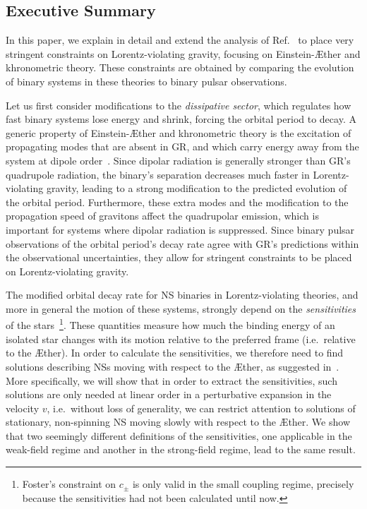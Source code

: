 \documentclass[prd,aps,twocolumn,nofootinbib,showpacs,superscriptaddress]{revtex4-1}
\begin{document}
\subsection{Executive Summary}

In this paper, we explain in detail and extend the analysis of Ref.~\cite{Yagi:2013qpa} to place very stringent constraints on Lorentz-violating gravity, 
focusing on Einstein-\AE ther and khronometric theory. These constraints are obtained by comparing the evolution of binary systems in these 
theories to binary pulsar observations. 

Let us first consider modifications to the {\it dissipative sector}, which regulates how fast binary systems lose energy and shrink,
forcing the orbital period to decay. A generic property of 
 Einstein-\AE ther and khronometric theory is the excitation of propagating modes that are absent in GR, and which carry
energy away from the system at dipole order~\cite{Foster:2006az,Foster:2007gr,Blas:2011zd}. 
Since dipolar radiation is generally stronger than GR's quadrupole radiation, 
the binary's separation decreases much faster in Lorentz-violating gravity, leading to a strong modification to the predicted evolution of the orbital period. 
Furthermore, these  extra modes and the modification to the propagation speed of gravitons affect the 
 quadrupolar  emission, which is important for systems where dipolar radiation is suppressed. 
Since binary pulsar observations of the orbital period's decay rate 
agree with GR's predictions within the observational uncertainties, 
they allow for stringent constraints to be placed on Lorentz-violating gravity. 

The modified orbital decay rate for NS binaries in Lorentz-violating theories, and more in general the motion of these systems,
 strongly depend on the {\textit{sensitivities}} of the stars~\cite{Foster:2007gr}\footnote{Foster's constraint on $c_{\pm}$ is only valid in the small coupling regime, precisely because the sensitivities had not been calculated until now.}. 
These quantities measure how much the binding energy of an isolated star changes with its motion relative
to the preferred frame (i.e.~relative to the \AE ther).
In order to calculate the sensitivities, we therefore need to find solutions describing NSs moving with respect to the \AE ther, 
as suggested in~\cite{Eling:2007xh}. 
More specifically, we will show that in order to extract the sensitivities, such solutions are only needed at linear order 
in a perturbative expansion in the velocity $v$, i.e.~without loss of generality,
we can restrict attention to solutions of stationary, non-spinning NS moving slowly with respect to the \AE ther.
We show that two seemingly different definitions of the sensitivities, one applicable in the
weak-field regime and another in the strong-field regime, lead to the same result.
\end{document}
